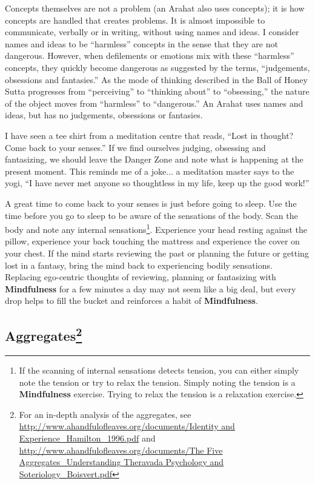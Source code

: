 Concepts themselves are not a problem (an Arahat also uses concepts); it is how concepts are handled that creates problems. It is almost impossible to communicate, verbally or in writing, without using names and ideas. I consider names and ideas to be “harmless” concepts in the sense that they are not dangerous. However, when defilements or emotions mix with these “harmless” concepts, they quickly become dangerous as suggested by the terms, “judgements, obsessions and fantasies.” As the mode of thinking described in the Ball of Honey Sutta progresses from “perceiving” to “thinking about” to “obsessing,” the nature of the object moves from “harmless” to “dangerous.” An Arahat uses names and ideas, but has no judgements, obsessions or fantasies.

I have seen a tee shirt from a meditation centre that reads, “Lost in thought? Come back to your senses.” If we find ourselves judging, obsessing and fantasizing, we should leave the Danger Zone and note what is happening at the present moment. This reminds me of a joke... a meditation master says to the yogi, “I have never met anyone so thoughtless in my life, keep up the good work!”

A great time to come back to your senses is just before going to sleep. Use the time before you go to sleep to be aware of the sensations of the body. Scan the body and note any internal sensations\footnote{If the scanning of internal sensations detects tension, you can either simply note the tension or try to relax the tension. Simply noting the tension is a \textbf{Mindfulness} exercise. Trying to relax the tension is a relaxation exercise.}. Experience your head resting against the pillow, experience your back touching the mattress and experience the cover on your chest. If the mind starts reviewing the past or planning the future or getting lost in a fantasy, bring the mind back to experiencing bodily sensations. Replacing ego-centric thoughts of reviewing, planning or fantasizing with \textbf{Mindfulness} for a few minutes a day may not seem like a big deal, but every drop helps to fill the bucket and reinforces a habit of \textbf{Mindfulness}.

\subsection*{Aggregates\footnote{For an in-depth analysis of the aggregates, see \url{http://www.ahandfulofleaves.org/documents/Identity and Experience_Hamilton_1996.pdf} and \url{http://www.ahandfulofleaves.org/documents/The Five Aggregates_Understanding Theravada Psychology and Soteriology_Boisvert.pdf}}}

